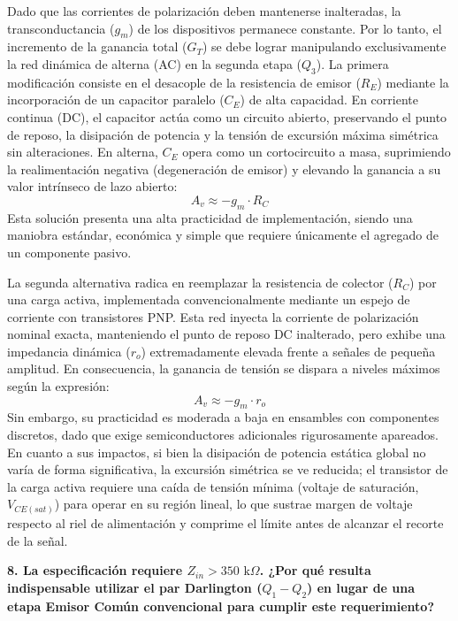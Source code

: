 Dado que las corrientes de polarización deben mantenerse inalteradas, la transconductancia ($g_m$) de los dispositivos permanece constante. Por lo tanto, el incremento de la ganancia total ($G_T$) se debe lograr manipulando exclusivamente la red dinámica de alterna (AC) en la segunda etapa ($Q_3$). La primera modificación consiste en el desacople de la resistencia de emisor ($R_E$) mediante la incorporación de un capacitor paralelo ($C_E$) de alta capacidad. En corriente continua (DC), el capacitor actúa como un circuito abierto, preservando el punto de reposo, la disipación de potencia y la tensión de excursión máxima simétrica sin alteraciones. En alterna, $C_E$ opera como un cortocircuito a masa, suprimiendo la realimentación negativa (degeneración de emisor) y elevando la ganancia a su valor intrínseco de lazo abierto:
$$A_v \approx -g_m \cdot R_C$$
Esta solución presenta una alta practicidad de implementación, siendo una maniobra estándar, económica y simple que requiere únicamente el agregado de un componente pasivo.

La segunda alternativa radica en reemplazar la resistencia de colector ($R_C$) por una carga activa, implementada convencionalmente mediante un espejo de corriente con transistores PNP. Esta red inyecta la corriente de polarización nominal exacta, manteniendo el punto de reposo DC inalterado, pero exhibe una impedancia dinámica ($r_o$) extremadamente elevada frente a señales de pequeña amplitud. En consecuencia, la ganancia de tensión se dispara a niveles máximos según la expresión:
$$A_v \approx -g_m \cdot r_o$$
Sin embargo, su practicidad es moderada a baja en ensambles con componentes discretos, dado que exige semiconductores adicionales rigurosamente apareados. En cuanto a sus impactos, si bien la disipación de potencia estática global no varía de forma significativa, la excursión simétrica se ve reducida; el transistor de la carga activa requiere una caída de tensión mínima (voltaje de saturación, $V_{CE(sat)}$) para operar en su región lineal, lo que sustrae margen de voltaje respecto al riel de alimentación y comprime el límite antes de alcanzar el recorte de la señal.

\textbf{8. La especificación requiere $Z_{in} > 350\text{ k}\Omega$. ¿Por qué resulta indispensable utilizar el par Darlington ($Q_1 - Q_2$) en lugar de una etapa Emisor Común convencional para cumplir este requerimiento?}

